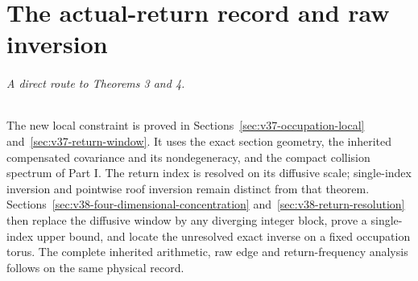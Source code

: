 \documentclass[11pt,reqno]{amsart}
\numberwithin{equation}{section}
\theoremstyle{definition}\newtheorem{definition}[theorem]{Definition}
\theoremstyle{remark}\newtheorem{remark}[theorem]{Remark}
\begin{document}
\part{The actual-return record and raw inversion}
\paragraph{A direct route to Theorems 3 and 4.}
The new local constraint is proved in
Sections~\ref{sec:v37-occupation-local} and~\ref{sec:v37-return-window}.
It uses the exact section geometry, the inherited compensated
covariance and its nondegeneracy, and the compact collision spectrum
of Part I. The return index is resolved on its diffusive scale;
single-index inversion and pointwise roof inversion remain distinct
from that theorem. Sections~\ref{sec:v38-four-dimensional-concentration}
and~\ref{sec:v38-return-resolution} then replace the diffusive window
by any diverging integer block, prove a single-index upper bound, and
locate the unresolved exact inverse on a fixed occupation torus. The complete inherited arithmetic, raw edge and
return-frequency analysis follows on the same physical record.

















\end{document}
